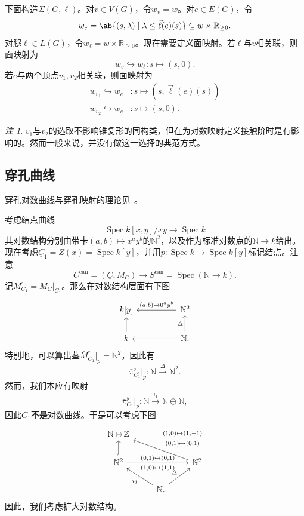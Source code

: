 \documentclass{amsart}
\theoremstyle{definition}
\theoremstyle{remark}
\newtheorem{rmk}[thm]{注}
\theoremstyle{plain}
\theoremstyle{definition}
\theoremstyle{remark}
\newcommand{\N}{\mathbb{N}}
\newcommand{\R}{\mathbb{R}}
\newcommand{\Z}{\mathbb{Z}}
\newcommand{\on}[1]{\operatorname{#1}}
\newcommand{\ul}[1]{\underline{#1}}
\newcommand{\1}{\mathbf{1}}
\newcommand{\2}{\mathbf{2}}
\newcommand{\3}{\mathbf{3}}
\DeclareMathOperator{\Spec}{Spec}
\begin{document}
下面构造\(\Sigma(G, \ell)\)。对\(v \in V(G)\)，令\(w_v = w\)。对\(e \in E(G)\)，令
\[ w_e = \ab\{ (s, \lambda) \mid \lambda \leq \vec{\ell}(e)(s) \} \subseteq w \times \R_{\geq 0}. \]
对腿\(\ell \in L(G)\)，令\(w_{\ell} = w \times \R_{\geq 0}\)。现在需要定义面映射。若\(\ell\)与\(v\)相关联，则面映射为
\[ w_v \hookrightarrow w_{\ell} \colon s \mapsto (s, 0). \]
若\(e\)与两个顶点\(v_1, v_2\)相关联，则面映射为
\begin{align*}
    w_{v_1} \hookrightarrow w_e &\colon s \mapsto (s, \vec{\ell}(e)(s)) \\
    w_{v_2} \hookrightarrow w_e & \colon s \mapsto (s, 0).
\end{align*}
\begin{rmk}
    \(v_1\)与\(v_2\)的选取不影响锥复形的同构类，但在为对数映射定义接触阶时是有影响的。然而一般来说，并没有做这一选择的典范方式。
\end{rmk}

\subsection{穿孔曲线}%
\label{sub:Punctured curves}

穿孔对数曲线与穿孔映射的理论见~\cite{ACGS2025}。

考虑结点曲线
\[ \Spec k[x,y]/xy \to \Spec k \]
其对数结构分别由带卡\((a,b) \mapsto x^a y^b\)的\(\N^2\)，以及作为标准对数点的\(\N \to k\)给出。现在考虑\(\ul{C}_1 = Z(x) = \Spec k[y]\)，并用\(p \colon \Spec k \to \Spec k[y]\)标记结点。注意
\[ C^{\on{can}} = (\ul{C}, M_C) \to S^{\on{can}} = \Spec(\N \to k). \]
记\(M_{C_1}^{\circ} = M_C|_{C_1}\)。那么在对数结构层面有下图
\begin{equation*}
\begin{tikzcd}
    k[y] & & \N^2 \ar{ll}[swap]{(a,b) \mapsto 0^a y^b} \\
    k \ar{u} & & \N \ar{ll} \ar{u}{\Delta}.
\end{tikzcd}
\end{equation*}
特别地，可以算出茎\(\bar{M}_{C_1}^{\circ}|_p = \N^2\)，因此有
\[ \bar{\pi}_{C_1^{\circ}}^{\flat} |_p \colon \N \xrightarrow{\Delta} \N^2. \]
然而，我们本应有映射
\[ \bar{\pi}^{\flat}_{C_1}|_p \colon \N \xrightarrow{i_1} \N \oplus \N, \]
因此\(C_1\)\textbf{不是}对数曲线。于是可以考虑下图
\begin{equation*}
\begin{tikzcd}
    \N \oplus \Z \\
    \N^2 \ar[hookrightarrow]{u} \ar{rr}{(0,1)\mapsto (0,1)}[swap]{(1,0)\mapsto (1,1)} & & \N^2 \ar{ull}[swap]{\Vectorstack{{(1,0)\mapsto(1,-1)} {(0,1)\mapsto(0,1)}}} \\
    & \N \ar{ul}{i_1} \ar{ur}{\Delta}.
\end{tikzcd}
\end{equation*}
因此，我们考虑扩大对数结构。
\end{document}
